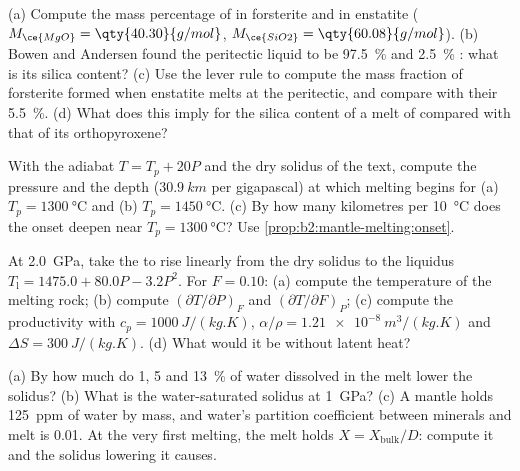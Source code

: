 \begin{exercise}[$\star\star$]\label{exo:b2:mantle-melting:6}
(a) Compute the mass percentage of  in forsterite  and in
enstatite  ($M_{\ce{MgO}} = \qty{40.30}{g/mol}$, $M_{\ce{SiO2}} =
\qty{60.08}{g/mol}$). (b) Bowen and Andersen found the peritectic liquid to be
\qty{97.5}{\percent}  and \qty{2.5}{\percent} : what is its
silica content? (c) Use the lever rule to compute the mass fraction of forsterite
formed when enstatite melts at the peritectic, and compare with their
\qty{5.5}{\percent}. (d) What does this imply for the silica content of a melt of
 compared with that of its orthopyroxene?
\end{exercise}

\begin{exercise}[$\star\star$]\label{exo:b2:mantle-melting:7}
With the adiabat $T = T_p + 20P$ and the dry solidus of the text, compute the
pressure and the depth ($\qty{30.9}{km}$ per gigapascal) at which melting begins
for (a) $T_p = \qty{1300}{\celsius}$ and (b) $T_p = \qty{1450}{\celsius}$. (c) By
how many kilometres per \qty{10}{\celsius} does the onset deepen near
$T_p = \qty{1300}{\celsius}$? Use \cref{prop:b2:mantle-melting:onset}.
\end{exercise}

\begin{exercise}[$\star\star$]\label{exo:b2:mantle-melting:8}
At \qty{2.0}{GPa}, take the  to rise linearly from the dry solidus to
the  liquidus $T_{\mathrm l} = 1475.0 + 80.0P - 3.2P^2$. For $F = 0.10$:
(a) compute the temperature of the melting rock; (b) compute $(\partial
T/\partial P)_F$ and $(\partial T/\partial F)_P$; (c) compute the productivity with
$c_p = \qty{1000}{J/(kg.K)}$, $\alpha/\rho = \qty{1.21e-8}{m^3/(kg.K)}$ and
$\Delta S = \qty{300}{J/(kg.K)}$. (d) What would it be without latent heat?
\end{exercise}

\begin{exercise}[$\star\star$]\label{exo:b2:mantle-melting:9}
(a) By how much do 1, 5 and \qty{13}{\percent} of water dissolved in the melt lower
the solidus? (b) What is the water-saturated solidus at \qty{1}{GPa}? (c) A mantle
holds \qty{125}{ppm} of water by mass, and water's partition coefficient between
minerals and melt is 0.01. At the very first melting, the melt holds $X =
X_{\text{bulk}}/D$: compute it and the solidus lowering it causes.
\end{exercise}


